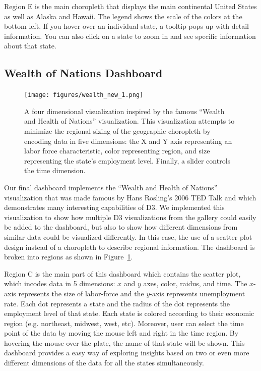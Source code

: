 \documentclass{sigchi}
\begin{document}
Region E is the main choropleth that displays the main continental United States as well as Alaska and Hawaii. The legend shows the scale of the colors at the bottom left. If you hover over an individual state, a tooltip pops up with detail information. You can also click on a state to zoom in and see specific information about that state.

\subsection{Wealth of Nations Dashboard}

\begin{figure}[!ht]
    \centering
    \texttt{[image: figures/wealth\_new\_1.png]}
    \caption{A four dimensional visualization inspired by the famous ``Wealth and Health of Nations'' visualization. This visualization attempts to minimize the regional sizing of the geographic choropleth by encoding data in five dimensions: the X and Y axis representing an labor force characteristic, color representing region, and size representing the state's employment level. Finally, a slider controls the time dimension.}
    \label{fig:wealth}
\end{figure}

Our final dashboard implements the ``Wealth and Health of Nations'' visualization that was made famous by Hans Rosling's 2006 TED Talk \cite{_wealth_????} and which demonstrates many interesting capabilities of D3. We implemented this visualization to show how multiple D3 visualizations from the gallery could easily be added to the dashboard, but also to show how different dimensions from similar data could be visualized differently. In this case, the use of a scatter plot design instead of a choropleth to describe regional information. The dashboard is broken into regions as shown in Figure~\ref{fig:wealth}.

Region C is the main part of this dashboard which contains the scatter plot, which incodes data in 5 dimensions: $x$ and $y$ axes, color, raidus, and time. The $x$-axis represents the size of labor-force and the $y$-axis represents unemployment rate. Each dot represents a state and the radius of the dot represents the employment level of that state. Each state is colored according to their economic region (e.g. northeast, midwest, west, etc). Moreover, user can select the time point of the data by moving the mouse left and right in the time region. By hovering the mouse over the plate, the name of that state will be shown. This dashboard provides a easy way of exploring insights based on two or even more different dimensions of the data for all the states simultaneously.
\end{document}

